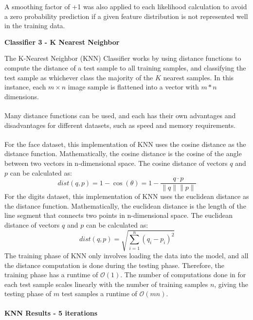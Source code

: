 \documentclass[11pt]{article}
\begin{document}
    A smoothing factor of +1 was also applied to each likelihood calculation to avoid a zero probability prediction if a given feature distribution is not represented well in the training data.
    
    \begin{center}
        \Large
        \textbf{Classifier 3 - K Nearest Neighbor}
    \end{center}
    \normalsize
    The K-Nearest Neighbor (KNN) Classifier works by using distance functions to compute
    the distance of a test sample to all training samples, and classifying the test sample
    as whichever class the majority of the $K$ nearest samples.
    In this instance, each $m \times n$ image sample is flattened into a vector with $m*n$ dimensions.\\\\
    Many distance functions can be used, and each has their own advantages and disadvantages for
    different datasets, such as speed and memory requirements.\\\\
    For the face dataset, this implementation of KNN uses the cosine distance as the distance function.
    Mathematically, the cosine distance is the cosine of the angle between two vectors in n-dimensional space.
    The cosine distance of vectors $q$ and $p$ can be calculated as:
    \[dist\left(q, p\right) = 1-\cos(\theta) = 1-\frac{q \cdot p}{\|q\|\|p\|}\]
    For the digits dataset, this implementation of KNN uses the euclidean distance as the distance function.
    Mathematically, the euclidean distance is the length of the line segment that connects two points in n-dimensional space.
    The euclidean distance of vectors $q$ and $p$ can be calculated as:
    \[dist\left(q, p\right) = \sqrt{\sum_{i=1}^{n}\left(q_i-p_i\right)^2}\]
    The training phase of KNN only involves loading the data into the model, and all the distance computation
    is done during the testing phase.
    Therefore, the training phase has a runtime of $\mathcal{O}(1)$.
    The number of computations done in for each test sample scales linearly with the number
    of training samples $n$, giving the testing phase of $m$ test samples a runtime of $\mathcal{O}(mn)$.\\\\
    \large
    \textbf{KNN Results - 5 iterations}
    \small
\end{document}
